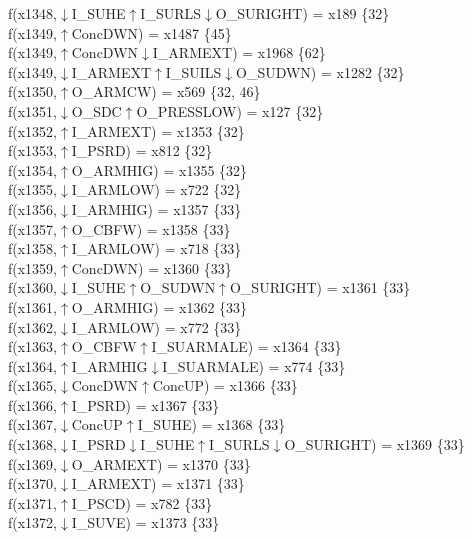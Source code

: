 f(x1348,$\downarrow$I\_SUHE$\uparrow$I\_SURLS$\downarrow$O\_SURIGHT) = x189 \{32\} \\  
f(x1349,$\uparrow$ConcDWN) = x1487 \{45\} \\  
f(x1349,$\uparrow$ConcDWN$\downarrow$I\_ARMEXT) = x1968 \{62\} \\  
f(x1349,$\downarrow$I\_ARMEXT$\uparrow$I\_SUILS$\downarrow$O\_SUDWN) = x1282 \{32\} \\  
f(x1350,$\uparrow$O\_ARMCW) = x569 \{32, 46\} \\  
f(x1351,$\downarrow$O\_SDC$\uparrow$O\_PRESSLOW) = x127 \{32\} \\  
f(x1352,$\uparrow$I\_ARMEXT) = x1353 \{32\} \\  
f(x1353,$\uparrow$I\_PSRD) = x812 \{32\} \\  
f(x1354,$\uparrow$O\_ARMHIG) = x1355 \{32\} \\  
f(x1355,$\downarrow$I\_ARMLOW) = x722 \{32\} \\  
f(x1356,$\downarrow$I\_ARMHIG) = x1357 \{33\} \\  
f(x1357,$\uparrow$O\_CBFW) = x1358 \{33\} \\  
f(x1358,$\uparrow$I\_ARMLOW) = x718 \{33\} \\  
f(x1359,$\uparrow$ConcDWN) = x1360 \{33\} \\  
f(x1360,$\downarrow$I\_SUHE$\uparrow$O\_SUDWN$\uparrow$O\_SURIGHT) = x1361 \{33\} \\  
f(x1361,$\uparrow$O\_ARMHIG) = x1362 \{33\} \\  
f(x1362,$\downarrow$I\_ARMLOW) = x772 \{33\} \\  
f(x1363,$\uparrow$O\_CBFW$\uparrow$I\_SUARMALE) = x1364 \{33\} \\  
f(x1364,$\uparrow$I\_ARMHIG$\downarrow$I\_SUARMALE) = x774 \{33\} \\  
f(x1365,$\downarrow$ConcDWN$\uparrow$ConcUP) = x1366 \{33\} \\  
f(x1366,$\uparrow$I\_PSRD) = x1367 \{33\} \\  
f(x1367,$\downarrow$ConcUP$\uparrow$I\_SUHE) = x1368 \{33\} \\  
f(x1368,$\downarrow$I\_PSRD$\downarrow$I\_SUHE$\uparrow$I\_SURLS$\downarrow$O\_SURIGHT) = x1369 \{33\} \\  
f(x1369,$\downarrow$O\_ARMEXT) = x1370 \{33\} \\  
f(x1370,$\downarrow$I\_ARMEXT) = x1371 \{33\} \\  
f(x1371,$\uparrow$I\_PSCD) = x782 \{33\} \\  
f(x1372,$\downarrow$I\_SUVE) = x1373 \{33\} \\  
